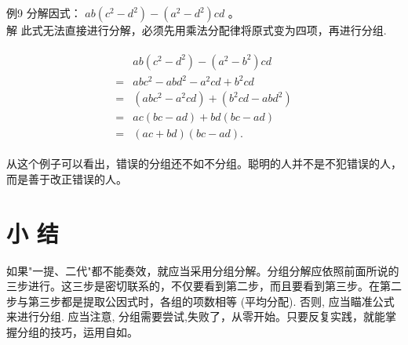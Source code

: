 \documentclass[10pt]{article}
\begin{document}
例9 分解因式： $a b\left(c^{2}-d^{2}\right)-\left(a^{2}-d^{2}\right) c d$ 。\\
解 此式无法直接进行分解，必须先用乘法分配律将原式变为四项，再进行分组.

\begin{align*}
\begin{aligned}
& a b\left(c^{2}-d^{2}\right)-\left(a^{2}-b^{2}\right) c d \\
= & a b c^{2}-a b d^{2}-a^{2} c d+b^{2} c d \\
= & \left(a b c^{2}-a^{2} c d\right)+\left(b^{2} c d-a b d^{2}\right) \\
= & a c(b c-a d)+b d(b c-a d) \\
= & (a c+b d)(b c-a d) .
\end{aligned}
\end{align*}

从这个例子可以看出，错误的分组还不如不分组。聪明的人并不是不犯错误的人，而是善于改正错误的人。

\section*{小 结}
如果"一提、二代"都不能奏效，就应当采用分组分解。分组分解应依照前面所说的三步进行。这三步是密切联系的，不仅要看到第二步，而且要看到第三步。在第二步与第三步都是提取公因式时，各组的项数相等 (平均分配). 否则, 应当瞄准公式来进行分组. 应当注意, 分组需要尝试,失败了，从零开始。只要反复实践，就能掌握分组的技巧，运用自如。
\end{document}
